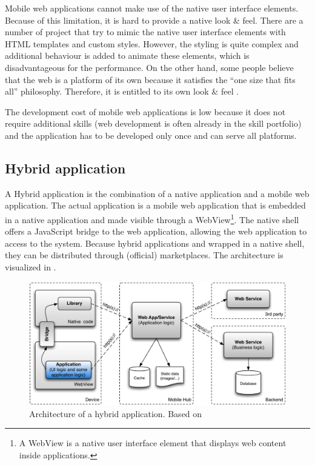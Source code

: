 Mobile web applications cannot make use of the native user interface elements. Because of this limitation, it is hard to provide a native look \& feel. There are a number of project that try to mimic the native user interface elements with HTML templates and custom styles. However, the styling is quite complex and additional behaviour is added to animate these elements, which is disadvantageous for the performance. On the other hand, some people believe that the web is a platform of its own because it satisfies the ``one size that fits all'' philosophy. Therefore, it is entitled to its own look \& feel \cite{Mahemoff:2011}.

The development cost of mobile web applications is low because it does not require additional skills (web development is often already in the skill portfolio) and the application has to be developed only once and can serve all platforms. 

\subsection{Hybrid application}

A Hybrid application is the combination of a native application and a mobile web application. The actual application is a mobile web application that is embedded in a native application and made visible through a WebView\footnote{A WebView is a native user interface element that displays web content inside applications.}. The native shell offers a JavaScript bridge to the web application, allowing the web application to access to the system. Because hybrid applications and wrapped in a native shell, they can be distributed through (official) marketplaces. The architecture is visualized in .

\begin{figure}[h]
    \begin{center}
        \includegraphics[width=\textwidth]{figs/hybrid.pdf}
        \caption{Architecture of a hybrid application. Based on \cite{Friese}}
        \label{fig:hybrid}
    \end{center}
\end{figure}

